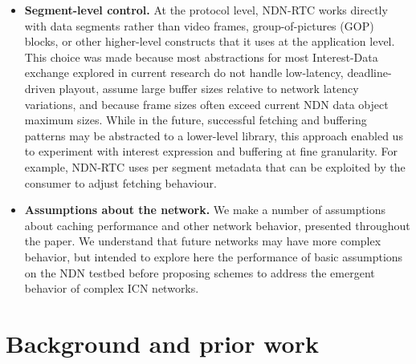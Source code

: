 \documentclass{icn/sig-alternate-2013} %
\newcommand{\ndnrtcName}{NDN-RTC} %
\begin{document}
\begin{itemize} 

\item \textbf{Segment-level control.}  At the protocol level, \ndnrtcName{} works directly with data segments rather than video frames, group-of-pictures (GOP) blocks, or other higher-level constructs that it uses at the application level.  %
This choice was made because most abstractions for most Interest-Data exchange explored in current research do not handle low-latency, deadline-driven playout, assume large buffer sizes relative to network latency variations, and because frame sizes often exceed current NDN data object maximum sizes. 
While in the future, successful fetching and buffering patterns may be abstracted to a lower-level library, this approach enabled us to experiment with interest expression and buffering at fine granularity. For example, \ndnrtcName{} uses per segment metadata that can be exploited by the consumer to adjust fetching behaviour. %

\item \textbf{Assumptions about the network.}  We make a number of  assumptions about caching performance and other network behavior, presented throughout the paper. We understand that future networks may have more complex behavior, but intended to explore here the performance of basic assumptions on the NDN testbed before proposing schemes to address the emergent behavior of complex ICN networks.

\end{itemize}


\section{Background and prior work}
\label{sec:bg}

\end{document}
